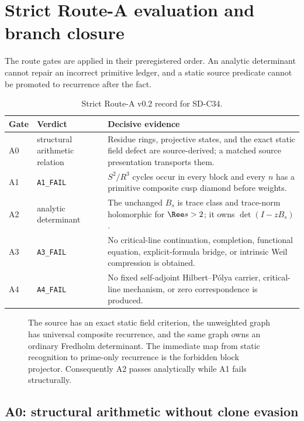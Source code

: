 \section{Strict Route-A evaluation and branch closure}
\label{sec:route-closure}

The route gates are applied in their preregistered order.  An analytic
determinant cannot repair an incorrect primitive ledger, and a static source
predicate cannot be promoted to recurrence after the fact.

\begin{table}[t]
\centering
\caption{Strict Route-A v0.2 record for SD-C34.}
\label{tab:route-record}
\small
\begin{tabularx}{\textwidth}{L{0.10\textwidth}L{0.32\textwidth}Y}
\toprule
Gate & Verdict & Decisive evidence \\
\midrule
A0 & structural arithmetic relation & Residue rings,
projective states, and the exact static field defect are source-derived; a
matched source presentation transports them. \\
A1 & \texttt{A1\_FAIL} & $S^2/R^3$ cycles occur in every block and every
$n$ has a primitive composite cusp diamond before weights. \\
A2 & analytic determinant & The unchanged $B_s$ is trace
class and trace-norm holomorphic for $\Ree s>2$; it owns
$\det(I-zB_s)$. \\
A3 & \texttt{A3\_FAIL} & No critical-line continuation, completion,
functional equation, explicit-formula bridge, or intrinsic Weil compression
is obtained. \\
A4 & \texttt{A4\_FAIL} & No fixed self-adjoint Hilbert--P\'olya carrier,
critical-line mechanism, or zero correspondence is produced. \\
\bottomrule
\end{tabularx}
\end{table}

\begin{figure}[t]
\centering
\resizebox{0.96\textwidth}{!}{}
\caption{The source has an exact static field criterion, the unweighted graph
has universal composite recurrence, and the same graph owns an ordinary
Fredholm determinant.  The immediate map from static recognition to
prime-only recurrence is the forbidden block projector.  Consequently A2
passes analytically while A1 fails structurally.}
\label{fig:route-trilemma}
\end{figure}

\subsection{A0: structural arithmetic without clone evasion}

